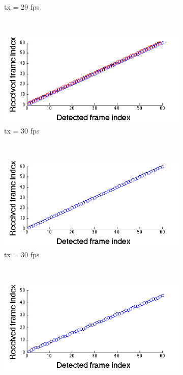 \begin{figure}[!t]
\begin{subfigure}[h]{0.25\textwidth}
      \caption{tx = 29 fps} \label{fig:tx_29fps}
   \end{subfigure}%
   ~
   \begin{subfigure}[h]{0.25\textwidth}
      \includegraphics[width=\textwidth]{fig/tx_30_2_new.png}
      \caption{tx = 30 fps} \label{fig:tx_30fps_2}
   \end{subfigure}%
   \\
   \begin{subfigure}[h]{0.25\textwidth}
      \includegraphics[width=\textwidth]{fig/tx_30.png}
      \caption{tx = 30 fps} \label{fig:tx_30fps}
   \end{subfigure}%
   ~   
   \begin{subfigure}[h]{0.25\textwidth}
      \includegraphics[width=\textwidth]{fig/tx_40.png}

\end{subfigure}
\end{figure}
